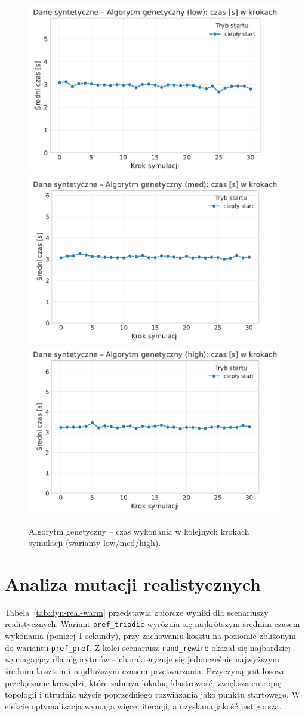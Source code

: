 \begin{figure}[H]
  \centering
  \includegraphics[width=0.32\linewidth]{assets/figures/dynamic/synthetic/synthetic_algorytm_genetyczny_time_over_steps_low.pdf}
  \includegraphics[width=0.32\linewidth]{assets/figures/dynamic/synthetic/synthetic_algorytm_genetyczny_time_over_steps_med.pdf}
  \includegraphics[width=0.32\linewidth]{assets/figures/dynamic/synthetic/synthetic_algorytm_genetyczny_time_over_steps_high.pdf}
  \caption{Algorytm genetyczny -- czas wykonania w kolejnych krokach symulacji (warianty low/med/high).}
  \label{fig:dyn-synth-genetic-time}
\end{figure}

\section{Analiza mutacji realistycznych}
Tabela~\ref{tab:dyn-real-warm} przedstawia zbiorcze wyniki dla scenariuszy realistycznych. Wariant \texttt{pref\_triadic} wyróżnia się najkrótszym średnim czasem wykonania (poniżej 1 sekundy), przy zachowaniu kosztu na poziomie zbliżonym do wariantu \texttt{pref\_pref}. Z kolei scenariusz \texttt{rand\_rewire} okazał się najbardziej wymagający dla algorytmów -- charakteryzuje się jednocześnie najwyższym średnim kosztem i najdłuższym czasem przetwarzania. Przyczyną jest losowe przełączanie krawędzi, które zaburza lokalną klastrowość, zwiększa entropię topologii i utrudnia użycie poprzedniego rozwiązania jako punktu startowego. W efekcie optymalizacja wymaga więcej iteracji, a uzyskana jakość jest gorsza.


